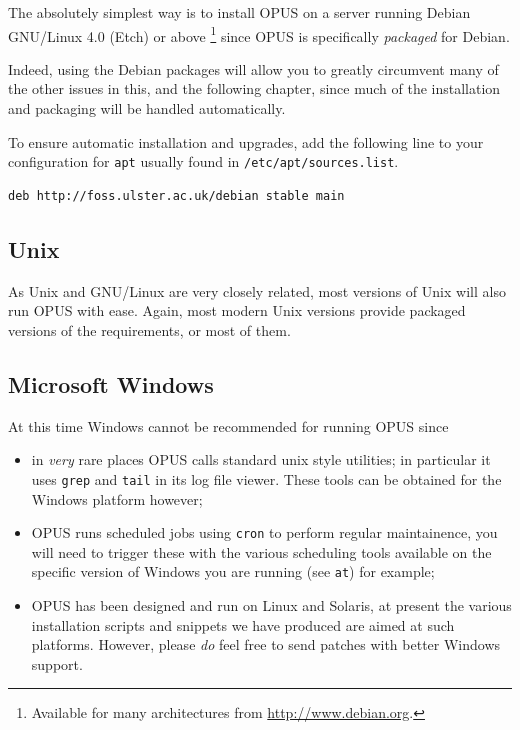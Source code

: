 \documentclass[12 pt]{book}
\begin{document}
The absolutely simplest way is to install OPUS on a server running Debian GNU/Linux 4.0 (Etch) or above%
\footnote{Available for many architectures from \url{http://www.debian.org}.}%
since OPUS is specifically \emph{packaged} for Debian.

Indeed, using the Debian packages will allow you to greatly circumvent many of the other issues in this, and the following chapter, since
much of the installation and packaging will be handled automatically.

To ensure automatic installation and upgrades, add the following line to your configuration for \lstinline!apt! usually found in
\lstinline!/etc/apt/sources.list!.

\begin{lstlisting}
deb http://foss.ulster.ac.uk/debian stable main
\end{lstlisting}

\subsection{Unix}

As Unix and GNU/Linux are very closely related, most versions of Unix will also run OPUS with ease. Again, most modern Unix versions
provide packaged versions of the requirements, or most of them.

\subsection{Microsoft Windows}

At this time Windows cannot be recommended for running OPUS since
\begin{itemize}
  \item in \emph{very} rare places OPUS calls standard unix style utilities; in particular it uses \texttt{grep} and \texttt{tail} in its log
    file viewer. These tools can be obtained for the Windows platform however;
  \item OPUS runs scheduled jobs using \texttt{cron} to perform regular maintainence, you will need to trigger these with the various
    scheduling tools available on the specific version of Windows you are running (see \texttt{at}) for example;
  \item OPUS has been designed and run on Linux and Solaris, at present the various installation scripts and snippets we have produced
    are aimed at such platforms. However, please \emph{do} feel free to send patches with better Windows support.
\end{itemize}
\end{document}
